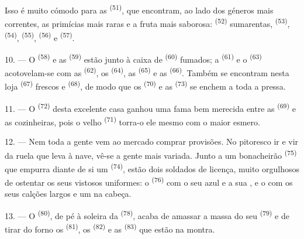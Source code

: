 Isso é muito cómodo para as  \textsuperscript{(51)}, que
encontram, ao lado dos géneros mais correntes, as primícias mais raras e a
fruta mais saborosa:  \textsuperscript{(52)} sumarentas,
 \textsuperscript{(53)},  \textsuperscript{(54)},
 \textsuperscript{(55)},  \textsuperscript{(56)} e
 \textsuperscript{(57)}.

\VUsaut{4.0mm}
\VUsaut{3.0mm}

10. --- O  \textsuperscript{(58)} e as 
\textsuperscript{(59)} estão junto à caixa de  \textsuperscript{(60)}
fumados; a  \textsuperscript{(61)} e o 
\textsuperscript{(63)} acotovelam-se com as  \textsuperscript{(62)}, os
 \textsuperscript{(64)}, as  \textsuperscript{(65)} e
as  \textsuperscript{(66)}. Também se encontram nesta loja
 \textsuperscript{(67)} frescos e 
\textsuperscript{(68)}, de modo que os  \textsuperscript{(70)} e as
 \textsuperscript{(73)} se enchem a toda a pressa.

11. --- O  \textsuperscript{(72)} desta excelente casa ganhou uma fama
bem merecida entre as  \textsuperscript{(69)} e as cozinheiras,
pois o velho  \textsuperscript{(71)} torra-o ele mesmo com o
maior esmero.

\VUsaut{4.0mm}
\VUsaut{3.0mm}

12. --- Nem toda a gente vem ao mercado comprar provisões. No pitoresco ir
e vir da ruela que leva à nave, vê-se a gente mais variada. Junto a um
bonacheirão  \textsuperscript{(75)} que empurra diante de si um
 \textsuperscript{(74)}, estão dois soldados de licença,
muito orgulhosos de ostentar os seus vistosos uniformes: o 
\textsuperscript{(76)} com o seu  azul e a sua , e o  com os seus calções largos e um
 na cabeça.

13. --- O  \textsuperscript{(80)}, de pé à soleira da
 \textsuperscript{(78)}, acaba de amassar a massa do seu
 \textsuperscript{(79)} e de tirar do forno os 
\textsuperscript{(81)}, os  \textsuperscript{(82)} e as 
\textsuperscript{(83)} que estão na montra.

